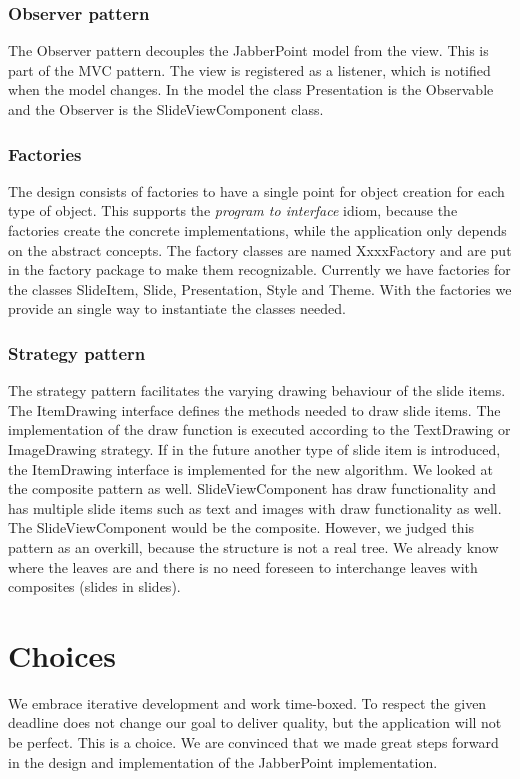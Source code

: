 \documentclass[a4paper]{article}
\begin{document}
\subsubsection{Observer pattern}
The Observer pattern decouples the JabberPoint model from the view. This is part of the MVC pattern. The view is registered as a listener, which is notified when the model changes. In the model the class Presentation is the Observable and the Observer is the SlideViewComponent class.

\subsubsection{Factories}
The design consists of factories to have a single point for object creation for each type of object. This supports the \textit{program to interface} idiom, because the factories create the concrete implementations, while the application only depends on the abstract concepts. The factory classes are named XxxxFactory and are put in the factory package to make them recognizable.
Currently we have factories for the classes SlideItem, Slide, Presentation, Style and Theme. With the factories we provide an single way to instantiate the classes needed.

\subsubsection{Strategy pattern}
The strategy pattern facilitates the varying drawing behaviour of the slide items. The ItemDrawing interface defines the methods needed to draw slide items. The implementation of the draw function is executed according to the TextDrawing or ImageDrawing strategy. If  in the future another type of slide item is introduced, the ItemDrawing interface is implemented for the new algorithm. We looked at the composite pattern as well. SlideViewComponent has draw functionality and has multiple slide items such as text and images with draw functionality as well. The SlideViewComponent would be the composite. However, we judged this pattern as an overkill, because the structure is not a real tree. We already know where the leaves are and there is no need foreseen to interchange leaves with composites (slides in slides).

\section{Choices}
We embrace iterative development and work time-boxed. To respect the given deadline does not change our goal to deliver quality, but the application will not be perfect. This is a choice. We are convinced that we made great steps forward in the design and implementation of the JabberPoint implementation.
\end{document}
